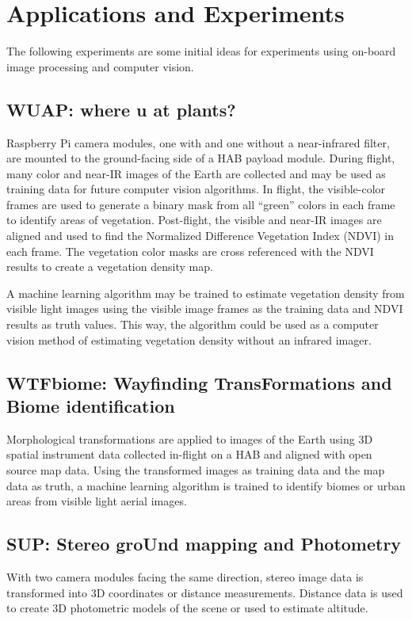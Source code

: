 \documentclass[conference]{IEEEtran} %
\begin{document}
\section{Applications and Experiments}
\label{sec:payloads}
The following experiments are some initial ideas for experiments using on-board image processing and computer vision.

\subsection{WUAP: where u at plants?}
\label{subsec:wuap}
Raspberry Pi camera modules, one with and one without a near-infrared filter, are mounted to the ground-facing side of a HAB payload module.
During flight, many color and near-IR images of the Earth are collected and may be used as training data for future computer vision algorithms.
In flight, the visible-color frames are used to generate a binary mask from all ``green'' colors in each frame to identify areas of vegetation.
Post-flight, the visible and near-IR images are aligned and used to find the Normalized Difference Vegetation Index (NDVI)\cite{nasa:ndvi} in each frame.
The vegetation color masks are cross referenced with the NDVI results to create a vegetation density map.

A machine learning algorithm may be trained to estimate vegetation density from visible light images using the visible image frames as the training data and NDVI results as truth values.
This way, the algorithm could be used as a computer vision method of estimating vegetation density without an infrared imager.

\subsection{WTFbiome: Wayfinding TransFormations and Biome identification}
\label{subsec:wtfbiome}
Morphological transformations are applied to images of the Earth using 3D spatial instrument data collected in-flight on a HAB and aligned with open source map data.
Using the transformed images as training data and the map data as truth, a machine learning algorithm is trained to identify biomes or urban areas from visible light aerial images.

\subsection{SUP: Stereo groUnd mapping and Photometry}
\label{subsec:sup}
With two camera modules facing the same direction, stereo image data is transformed into 3D coordinates or distance measurements.
Distance data is used to create 3D photometric models of the scene or used to estimate altitude.
\end{document}
